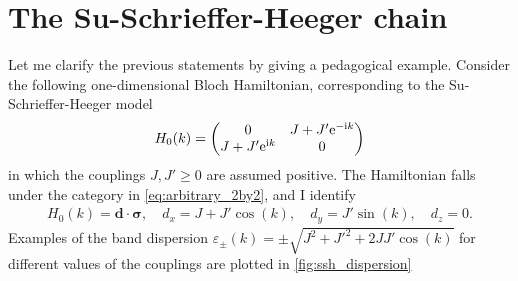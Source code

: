 \section{The Su-Schrieffer-Heeger chain}
\label{sec:the_SSH_chain}
%
%
Let me clarify the previous statements by giving a pedagogical example.
Consider the following one-dimensional Bloch Hamiltonian, corresponding to the Su-Schrieffer-Heeger model~\cite{Heeger1988}
\begin{align}
    H_0(k)
    =
    \begin{pmatrix}
        0 & J+J'\mathrm e^{-\mathrm i k}\\
        J+J'\mathrm e^{\mathrm i k} & 0
    \end{pmatrix}
\end{align}
in which the couplings $J,J'\geq0$ are assumed positive.
The Hamiltonian falls under the category in \ref{eq:arbitrary_2by2}, and I identify
\begin{align}
    H_0(k) = {\bm d}\cdot{\bm\sigma},
    \quad
    d_x = J+J'\cos(k),
    \quad
    d_y = J'\sin(k),
    \quad
    d_z = 0.
\end{align}
Examples of the band dispersion $\varepsilon_\pm(k)=\pm\sqrt{J^2+J'^2+2JJ'\cos(k)}$ for different values of the couplings are plotted in \cref{fig:ssh_dispersion}
